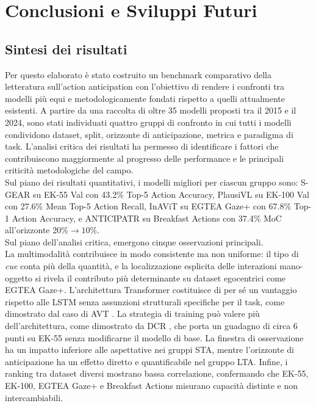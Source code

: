 \chapter{Conclusioni e Sviluppi Futuri}
\section{Sintesi dei risultati}
Per questo elaborato è stato costruito un benchmark comparativo della letteratura sull'action anticipation con l'obiettivo di rendere i confronti tra modelli più equi e metodologicamente fondati rispetto a quelli attualmente esistenti. A partire da una raccolta di oltre 35 modelli proposti tra il 2015 e il 2024, sono stati individuati quattro gruppi di confronto in cui tutti i modelli condividono dataset, split, orizzonte di anticipazione, metrica e paradigma di task. L'analisi critica dei risultati ha permesso di identificare i fattori che contribuiscono maggiormente al progresso delle performance e le principali criticità metodologiche del campo. \\
Sul piano dei risultati quantitativi, i modelli migliori per ciascun gruppo sono: S-GEAR \cite{diko2024semantically} su EK-55 Val con 43.2\% Top-5 Action Accuracy, PlausiVL \cite{mittal2024can} su EK-100 Val con 27.6\% Mean Top-5 Action Recall, InAViT \cite{roy2024interaction} su EGTEA Gaze+ con 67.8\% Top-1 Action Accuracy, e ANTICIPATR \cite{nawhal2022rethinking} su Breakfast Actions con 37.4\% MoC all'orizzonte 20\%$\to10$\%. \\
Sul piano dell'analisi critica, emergono cinque osservazioni principali.  \\
La multimodalità contribuisce in modo consistente ma non uniforme: il tipo di \textit{cue} conta più della quantità, e la localizzazione esplicita delle interazioni mano-oggetto si rivela il contributo più determinante su dataset egocentrici come EGTEA Gaze+. L'architettura Transformer costituisce di per sé un vantaggio rispetto alle LSTM senza assunzioni strutturali specifiche per il task, come dimostrato dal caso di AVT \cite{girdhar2021anticipative}. La strategia di training può valere più dell'architettura, come dimostrato da DCR \cite{xu2022learning}, che porta un guadagno di circa 6 punti su EK-55 senza modificarne il modello di base. La finestra di osservazione ha un impatto inferiore alle aspettative nei gruppi STA, mentre l'orizzonte di anticipazione ha un effetto diretto e quantificabile nel gruppo LTA. Infine, i ranking tra dataset diversi mostrano bassa correlazione, confermando che EK-55, EK-100, EGTEA Gaze+ e Breakfast Actions misurano capacità distinte e non intercambiabili.
